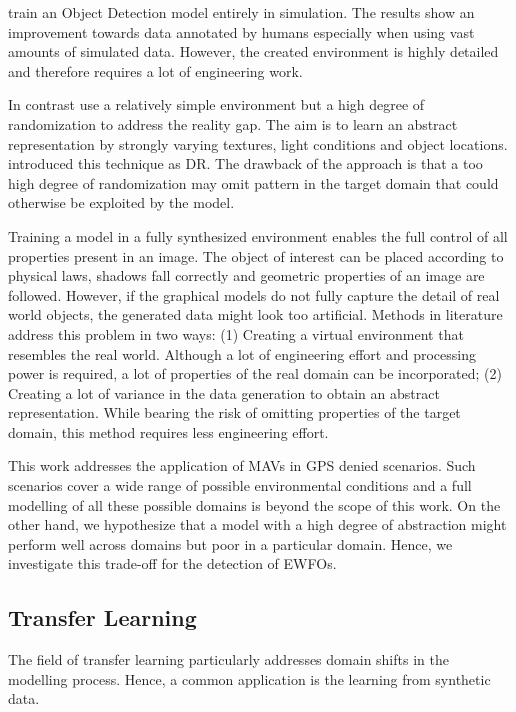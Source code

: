 \citeauthor{Johnson-Roberson2016} \cite{Johnson-Roberson2016} train an Object Detection model entirely in simulation. The results show an improvement towards data annotated by humans especially when using vast amounts of simulated data. However, the created environment is highly detailed and therefore requires a lot of engineering work. 

In contrast \cite{Sadeghi2016, Tobin2017, Tremblay2018a} use a relatively simple environment but a high degree of randomization to address the reality gap. The aim is to learn an abstract representation by strongly varying textures, light conditions and object locations. \citeauthor{Tobin2017} introduced this technique as \ac{DR}. The drawback of the approach is that a too high degree of randomization may omit pattern in the target domain that could otherwise be exploited by the model. 

Training a model in a fully synthesized environment enables the full control of all properties present in an image. The object of interest can be placed according to physical laws, shadows fall correctly and geometric properties of an image are followed. However, if the graphical models do not fully capture the detail of real world objects, the generated data might look too artificial. Methods in literature address this problem in two ways: (1) Creating a virtual environment that resembles the real world. Although a lot of engineering effort and processing power is required, a lot of properties of the real domain can be incorporated; (2) Creating a lot of variance in the data generation to obtain an abstract representation. While bearing the risk of omitting properties of the target domain, this method requires less engineering effort.

This work addresses the application of \acp{MAV} in \ac{GPS} denied scenarios. Such scenarios cover a wide range of possible environmental conditions and a full modelling of all these possible domains is beyond the scope of this work. On the other hand, we hypothesize that a model with a high degree of abstraction might perform well across domains but poor in a particular domain. Hence, we investigate this trade-off for the detection of \acp{EWFO}.


\subsection{Transfer Learning}

The field of transfer learning particularly addresses domain shifts in the modelling process. Hence, a common application is the learning from synthetic data.

